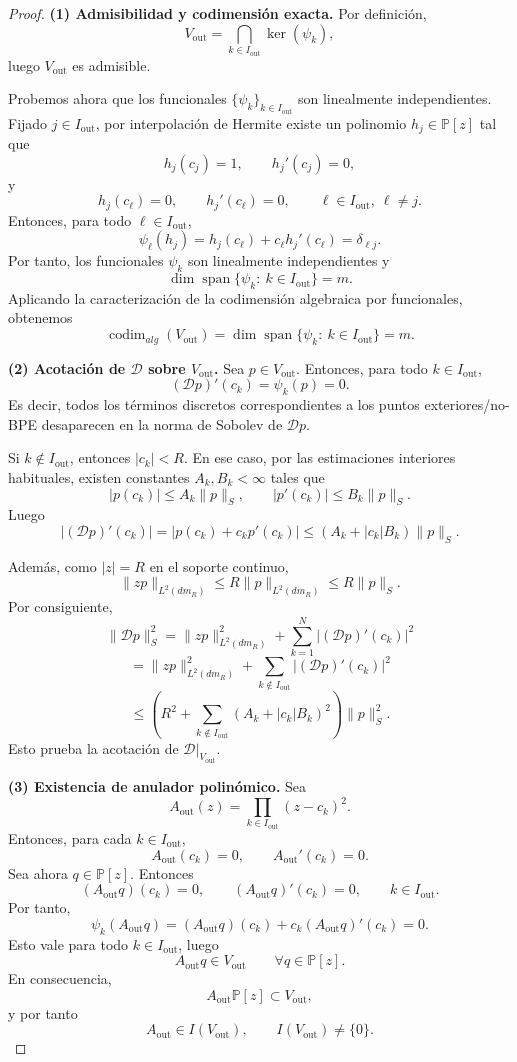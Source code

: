 \documentclass[12pt,a4paper]{article}
\theoremstyle{definition}
\theoremstyle{remark}
\begin{document}
\begin{proof}
	\textbf{(1) Admisibilidad y codimensión exacta.}
	Por definición,
	\[
		V_{\mathrm{out}}=\bigcap_{k\in I_{\mathrm{out}}}\ker(\psi_k),
	\]
	luego $V_{\mathrm{out}}$ es admisible.

	Probemos ahora que los funcionales $\{\psi_k\}_{k\in I_{\mathrm{out}}}$ son linealmente
	independientes. Fijado $j\in I_{\mathrm{out}}$, por interpolación de Hermite existe un
	polinomio $h_j\in\mathbb P[z]$ tal que
	\[
		h_j(c_j)=1,\qquad h_j'(c_j)=0,
	\]
	y
	\[
		h_j(c_\ell)=0,\qquad h_j'(c_\ell)=0,
		\qquad \ell\in I_{\mathrm{out}},\ \ell\neq j.
	\]
	Entonces, para todo $\ell\in I_{\mathrm{out}}$,
	\[
		\psi_\ell(h_j)=h_j(c_\ell)+c_\ell h_j'(c_\ell)=\delta_{\ell j}.
	\]
	Por tanto, los funcionales $\psi_k$ son linealmente independientes y
	\[
		\dim\operatorname{span}\{\psi_k:\ k\in I_{\mathrm{out}}\}=m.
	\]
	Aplicando la caracterización de la codimensión algebraica por funcionales, obtenemos
	\[
		\operatorname{codim}_{alg}(V_{\mathrm{out}})
		=
		\dim\operatorname{span}\{\psi_k:\ k\in I_{\mathrm{out}}\}
		=
		m.
	\]

	\medskip
	\textbf{(2) Acotación de $\mathcal D$ sobre $V_{\mathrm{out}}$.}
	Sea $p\in V_{\mathrm{out}}$. Entonces, para todo $k\in I_{\mathrm{out}}$,
	\[
		(\mathcal D p)'(c_k)=\psi_k(p)=0.
	\]
	Es decir, todos los términos discretos correspondientes a los puntos exteriores/no-BPE
	desaparecen en la norma de Sobolev de $\mathcal D p$.

	Si $k\notin I_{\mathrm{out}}$, entonces $|c_k|<R$. En ese caso, por las estimaciones
	interiores habituales, existen constantes $A_k,B_k<\infty$ tales que
	\[
		|p(c_k)|\le A_k\|p\|_S,
		\qquad
		|p'(c_k)|\le B_k\|p\|_S.
	\]
	Luego
	\[
		|(\mathcal D p)'(c_k)|
		=
		|p(c_k)+c_kp'(c_k)|
		\le
		(A_k+|c_k|B_k)\|p\|_S.
	\]

	Además, como $|z|=R$ en el soporte continuo,
	\[
		\|zp\|_{L^2(dm_R)}\le R\|p\|_{L^2(dm_R)}\le R\|p\|_S.
	\]
	Por consiguiente,
	\[
		\|\mathcal D p\|_S^2
		=
		\|zp\|_{L^2(dm_R)}^2
		+
		\sum_{k=1}^N |(\mathcal D p)'(c_k)|^2
	\]
	\[
		=
		\|zp\|_{L^2(dm_R)}^2
		+
		\sum_{k\notin I_{\mathrm{out}}} |(\mathcal D p)'(c_k)|^2
	\]
	\[
		\le
		\left(
		R^2+\sum_{k\notin I_{\mathrm{out}}}(A_k+|c_k|B_k)^2
		\right)\|p\|_S^2.
	\]
	Esto prueba la acotación de $\mathcal D|_{V_{\mathrm{out}}}$.

	\medskip
	\textbf{(3) Existencia de anulador polinómico.}
	Sea
	\[
		A_{\mathrm{out}}(z)=\prod_{k\in I_{\mathrm{out}}}(z-c_k)^2.
	\]
	Entonces, para cada $k\in I_{\mathrm{out}}$,
	\[
		A_{\mathrm{out}}(c_k)=0,
		\qquad
		A_{\mathrm{out}}'(c_k)=0.
	\]
	Sea ahora $q\in\mathbb P[z]$. Entonces
	\[
		(A_{\mathrm{out}}q)(c_k)=0,
		\qquad
		(A_{\mathrm{out}}q)'(c_k)=0,
		\qquad k\in I_{\mathrm{out}}.
	\]
	Por tanto,
	\[
		\psi_k(A_{\mathrm{out}}q)
		=
		(A_{\mathrm{out}}q)(c_k)+c_k(A_{\mathrm{out}}q)'(c_k)
		=
		0.
	\]
	Esto vale para todo $k\in I_{\mathrm{out}}$, luego
	\[
		A_{\mathrm{out}}q\in V_{\mathrm{out}}
		\qquad \forall q\in\mathbb P[z].
	\]
	En consecuencia,
	\[
		A_{\mathrm{out}}\mathbb P[z]\subset V_{\mathrm{out}},
	\]
	y por tanto
	\[
		A_{\mathrm{out}}\in I(V_{\mathrm{out}}),
		\qquad
		I(V_{\mathrm{out}})\neq\{0\}.
	\]


\end{proof}
\end{document}
